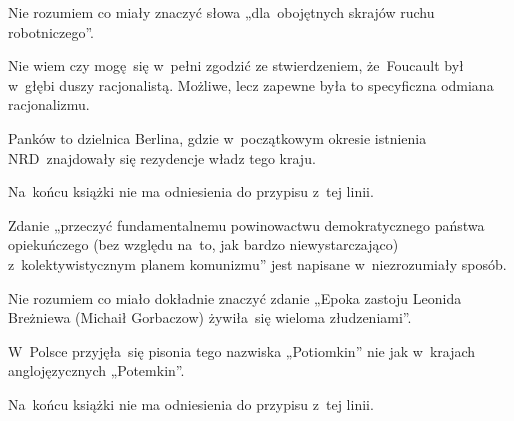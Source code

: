 \documentclass[a4paper,11pt]{article}
\begin{document}
\vspace{\spaceFour}



\start {} Nie rozumiem co miały znaczyć słowa
„dla~obojętnych skrajów ruchu robotniczego”.

\vspace{\spaceFour}



\start {} Nie wiem czy mogę~się w~pełni zgodzić ze
stwierdzeniem, że~Foucault był w~głębi duszy racjonalistą. Możliwe,
lecz zapewne była to specyficzna odmiana racjonalizmu.

\vspace{\spaceFour}



\start {} Panków to dzielnica Berlina, gdzie
w~początkowym okresie istnienia NRD~znajdowały się rezydencje władz
tego kraju.

\vspace{\spaceFour}



\start {} Na~końcu książki nie ma odniesienia do przypisu
z~tej linii.

\vspace{\spaceFour}



\start {} Zdanie „przeczyć fundamentalnemu
powinowactwu demokratycznego państwa opiekuńczego (bez względu na~to,
jak bardzo niewystarczająco) z~kolektywistycznym planem komunizmu”
jest napisane w~niezrozumiały sposób.

\vspace{\spaceFour}



\start {} Nie rozumiem co miało dokładnie znaczyć
zdanie „Epoka zastoju Leonida Breżniewa (Michaił Gorbaczow)
żywiła~się wieloma złudzeniami”.

\vspace{\spaceFour}



\start {} W~Polsce przyjęła~się pisonia tego nazwiska
„Potiomkin” nie jak w~krajach anglojęzycznych „Potemkin”.

\vspace{\spaceFour}



\start {} Na~końcu książki nie ma odniesienia do przypisu
z~tej linii.

\vspace{\spaceFour}
\end{document}

